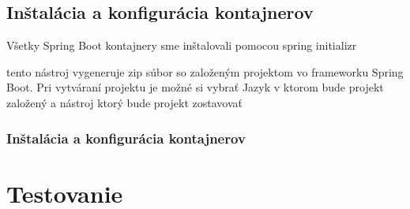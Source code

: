   

  

  

\subsection{Inštalácia a konfigurácia kontajnerov} 

\noindent Všetky Spring Boot kontajnery sme inštalovali pomocou spring initializr 


tento nástroj vygeneruje zip súbor so založeným projektom vo frameworku Spring Boot. Pri vytváraní projektu je možné si vybrať Jazyk v ktorom bude projekt založený a nástroj ktorý bude projekt zostavovať %

\subsubsection{Inštalácia a konfigurácia kontajnerov} 

  

  

  

  

\section{Testovanie} 


  

  

  

  

\section{} 

 

 